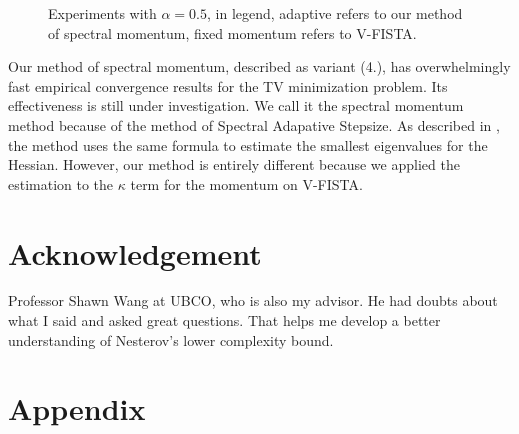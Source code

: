 \documentclass[]{article}
\theoremstyle{definition}
\numberwithin{equation}{subsection}
\begin{document}
\begin{figure}[H]
{            }
            \caption{Experiments with $\alpha = 0.5$, in legend, adaptive refers to our method of spectral momentum, fixed momentum refers to V-FISTA. }
            \label{fig:results2}
        \end{figure}
        Our method of spectral momentum, described as variant (4.), has overwhelmingly fast empirical convergence results for the TV minimization problem. 
        Its effectiveness is still under investigation. 
        We call it the spectral momentum method because of the method of Spectral Adapative Stepsize. 
        As described in \cite[4.1]{goldstein_field_2016}, the method uses the same formula to estimate the smallest eigenvalues for the Hessian. 
        However, our method is entirely different because we applied the estimation to the $\kappa$ term for the momentum on V-FISTA. 

\section*{Acknowledgement}
    Professor Shawn Wang at UBCO, who is also my advisor. 
    He had doubts about what I said and asked great questions. 
    That helps me develop a better understanding of Nesterov's lower complexity bound. 

\pagebreak        
\appendix


\section{Appendix} 
    





\end{document}
